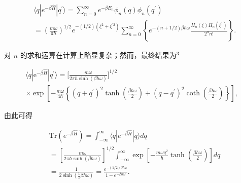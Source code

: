 \begin{equation}\tag{5.3.22}\label{eq:5.3.22}
\begin{array}{rl} & { \langle q | e ^{- \beta \hat { H} } | q ^{\prime} \rangle = \displaystyle \sum _ { n = 0 } ^{\infty} e ^{- \beta E _ { n} } \phi _ { n } ( q ) \phi _ { n } ( q ^{\prime} ) } \\& {  = \left( \frac { m \omega } { \pi \hbar } \right) ^{1 / 2} e ^{- ( 1 / 2 ) ( \xi ^ { 2} + \xi ^{\prime 2} ) } \displaystyle \sum _ { n = 0 } ^{\infty} \left\{ e ^{- ( n + 1 / 2 ) \beta \hbar \omega} \frac { H _ { n } ( \xi ) H _ { n } ( \xi ^{\prime} ) } { 2 ^{n} n ! } \right\} . } \end{array}
\end{equation}

对 \(n\) 的求和运算在计算上略显复杂；然而，最终结果为\(^{3}\)

\begin{equation}\tag{5.3.23}\label{eq:5.3.23}
\begin{array}{r} { \langle q | \mathrm { e } ^{- \beta \hat { H} } | q ^{\prime} \rangle = \bigg [ \frac { m \omega } { 2 \pi \hbar \sinh ( \beta \hbar \omega ) } \bigg ] ^{1 / 2} } \\{ \times \exp \left[ - \frac { m \omega } { 4 \hbar } \left\{ ( q + q ^{\prime} ) ^{2} \operatorname { t a n h } \left( \frac { \beta \hbar \omega } { 2 } \right) + ( q - q ^{\prime} ) ^{2} \coth \left( \frac { \beta \hbar \omega } { 2 } \right) \right\} \right] , } \end{array}
\end{equation}

由此可得

\begin{equation}\tag{5.3.24}\label{eq:5.3.24}
\begin{array}{rl} & { \mathrm { T r } ( e ^{- \beta \hat { H} } ) = \int _ { - \infty } ^{\infty} \langle q | e ^{- \beta \hat { H} } | q \rangle d q } \\& {  = \left[ \frac { m \omega } { 2 \pi \hbar \sinh ( \beta \hbar \omega ) } \right] ^{1 / 2} \int _ { - \infty } ^{\infty} \exp \left[ - \frac { m \omega q ^{2} } { \hbar } \operatorname { t a n h } \left( \frac { \beta \hbar \omega } { 2 } \right) \right] d q } \\& { = \frac { 1 } { 2 \sinh \left( \frac { 1 } { 2 } \beta \hbar \omega \right) } = \frac { e ^{- ( 1 / 2 ) \beta \hbar \omega} } { 1 - e ^{- \beta \hbar \omega} } . } \end{array}
\end{equation}

